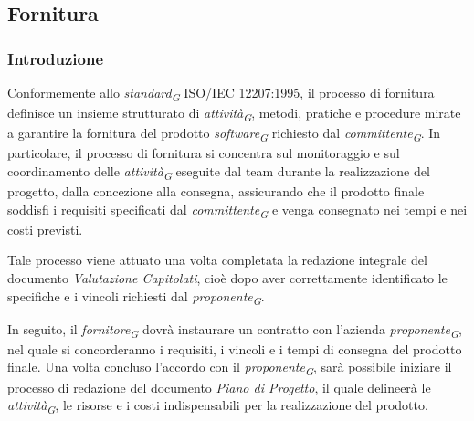 \subsection{Fornitura}
\subsubsection{Introduzione}
Conformemente allo \textit{standard}\textsubscript{\textit{G}} ISO/IEC 12207:1995, il processo di fornitura definisce un insieme strutturato di \textit{attività}\textsubscript{\textit{G}}, metodi, pratiche e procedure mirate a garantire la fornitura del prodotto \textit{software}\textsubscript{\textit{G}} richiesto dal \textit{committente}\textsubscript{\textit{G}}. 
In particolare, il processo di fornitura si concentra sul monitoraggio e sul coordinamento delle \textit{attività}\textsubscript{\textit{G}} eseguite dal team durante la realizzazione del progetto, dalla concezione alla consegna, assicurando che il prodotto finale soddisfi i requisiti specificati dal \textit{committente}\textsubscript{\textit{G}} e venga consegnato nei tempi e nei costi previsti.

\vspace{0.2cm}

Tale processo viene attuato una volta completata la redazione integrale del documento \textit{Valutazione Capitolati}, cioè dopo aver correttamente identificato le specifiche e i vincoli richiesti dal \textit{proponente}\textsubscript{\textit{G}}.

\vspace{0.2cm}

In seguito, il \textit{fornitore}\textsubscript{\textit{G}} dovrà instaurare un contratto con l'azienda \textit{proponente}\textsubscript{\textit{G}}, nel quale si concorderanno i requisiti, i vincoli e i tempi di consegna del prodotto finale. Una volta concluso l'accordo con il \textit{proponente}\textsubscript{\textit{G}}, sarà possibile iniziare il processo di redazione del documento
\textit{Piano di Progetto}, il quale delineerà le \textit{attività}\textsubscript{\textit{G}}, le risorse e i costi indispensabili per la realizzazione del prodotto.

